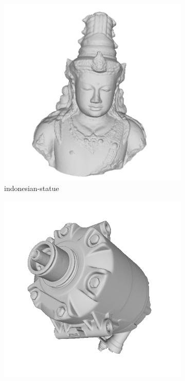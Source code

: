 \begin{figure}
		\begin{subfigure}[b]{0.23\linewidth}
		\includegraphics[width=\linewidth]{./Figures/train-dataset/24.indonesian-statue.png}
		\caption{indonesian-statue}
	\end{subfigure}
	\begin{subfigure}[b]{0.23\linewidth}
		\includegraphics[width=\linewidth]{./Figures/train-dataset/25.industrial-compressor.png}

\end{subfigure}
\end{figure}
